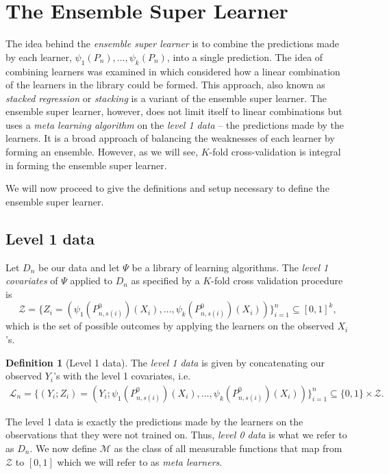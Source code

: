 \documentclass[11pt, a4paper]{article}
\theoremstyle{definition}
\newtheorem{definition}[theorem]{Definition}
\theoremstyle{remark}
\newcommand{\ml}{k}
\newcommand{\la}{\psi}
\newcommand{\lib}{\Psi}
\newcommand{\lone}{\mathcal{L}}
\begin{document}
\section{The Ensemble Super Learner}
The idea behind the \textit{ensemble super learner} is to combine the predictions made by each learner, $\la_1(P_{n}), \ldots, \la_k(P_{n}) $, into a single prediction. The idea of combining learners was examined in \cite{breiman1996stacked} which considered how a linear combination of the learners in the library could be formed. This approach, also known as \textit{stacked regression} or \textit{stacking} is a variant of the ensemble super learner. The ensemble super learner, however, does not limit itself to linear combinations but uses a \textit{meta learning algorithm} on the \textit{level 1 data} -- the predictions made by the learners. It is a broad approach of balancing the weaknesses of each learner by forming an ensemble. However, as we will see, $ K $-fold cross-validation is integral in forming the ensemble super learner. 

We will now proceed to give the definitions and setup necessary to define the ensemble super learner.
\subsection{Level 1 data}
Let $ D_n $ be our data and let $ \lib $ be a library of learning algorithms. The \textit{level 1 covariates} of $ \lib $ applied to $ D_n $ as specified by a $ K $-fold cross validation procedure is  
$$ \mathcal{Z} = \{Z_i = (\la_1(P_{n, s(i)}^{0})(X_i), \ldots, \la_\ml(P_{n, s(i)}^0)(X_i) ) \}_{i = 1}^{n} \subseteq [0,1]^{k}, $$
which is the set of possible outcomes by applying the learners on the observed $ X_i $'s. 

\begin{definition}[Level 1 data]
    The \textit{level 1 data} is given by concatenating our observed $ Y_i $'s with the level 1 covariates, i.e.
    \begin{align*}
        \lone_{n}  = \{(Y_i ; Z_i) = (Y_i; \la_1(P_{n, s(i)}^{0})(X_i), \ldots, \la_\ml(P_{n, s(i)}^{0})(X_i)) \}_{i = 1}^n \subseteq \{0,1\} \times \mathcal{Z}. 
    \end{align*}
\end{definition}
The level 1 data is exactly the predictions made by the learners on the observations that they were not trained on. Thus, \textit{level 0 data} is what we refer to as $ D_n $. 
We now define $ \mathcal{M} $ as the class of all measurable functions that map from $ \mathcal{Z} $ to $ [0,1] $ which we will refer to as \textit{meta learners}. 
\end{document}
